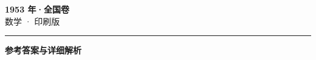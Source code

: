 \documentclass[zihao=5, a4paper]{ctexart}
\begin{document}
\begin{center}
  {\Large\bfseries 1953 年·全国卷}\\[4pt]
  {\large 数学 · 印刷版}
\end{center}
\medskip
{}

\par\bigskip\hrule\bigskip
{}
\begin{center}{\large\bfseries 参考答案与详细解析}\end{center}
\smallskip

\end{document}

